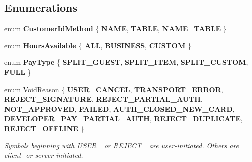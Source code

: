 \subsection*{Enumerations}
\begin{DoxyCompactItemize}
\item 
\mbox{\label{namespacecom_1_1clover_1_1sdk_1_1v3_1_1order_afc10d003bf89af56702a924943b43e70}} 
enum {\bfseries Customer\+Id\+Method} \{ {\bfseries N\+A\+ME}, 
{\bfseries T\+A\+B\+LE}, 
{\bfseries N\+A\+M\+E\+\_\+\+T\+A\+B\+LE}
 \}
\item 
\mbox{\label{namespacecom_1_1clover_1_1sdk_1_1v3_1_1order_adda3ca304970ac1775eb37a3d8f3b829}} 
enum {\bfseries Hours\+Available} \{ {\bfseries A\+LL}, 
{\bfseries B\+U\+S\+I\+N\+E\+SS}, 
{\bfseries C\+U\+S\+T\+OM}
 \}
\item 
\mbox{\label{namespacecom_1_1clover_1_1sdk_1_1v3_1_1order_a0087c2efbeb2cfefd1bc3b78a3f7dbd8}} 
enum {\bfseries Pay\+Type} \{ {\bfseries S\+P\+L\+I\+T\+\_\+\+G\+U\+E\+ST}, 
{\bfseries S\+P\+L\+I\+T\+\_\+\+I\+T\+EM}, 
{\bfseries S\+P\+L\+I\+T\+\_\+\+C\+U\+S\+T\+OM}, 
{\bfseries F\+U\+LL}
 \}
\item 
enum \hyperlink{namespacecom_1_1clover_1_1sdk_1_1v3_1_1order_acb5aac0c1f6aeeb5b636223a69d2dec2}{Void\+Reason} \{ \newline
{\bfseries U\+S\+E\+R\+\_\+\+C\+A\+N\+C\+EL}, 
{\bfseries T\+R\+A\+N\+S\+P\+O\+R\+T\+\_\+\+E\+R\+R\+OR}, 
{\bfseries R\+E\+J\+E\+C\+T\+\_\+\+S\+I\+G\+N\+A\+T\+U\+RE}, 
{\bfseries R\+E\+J\+E\+C\+T\+\_\+\+P\+A\+R\+T\+I\+A\+L\+\_\+\+A\+U\+TH}, 
\newline
{\bfseries N\+O\+T\+\_\+\+A\+P\+P\+R\+O\+V\+ED}, 
{\bfseries F\+A\+I\+L\+ED}, 
{\bfseries A\+U\+T\+H\+\_\+\+C\+L\+O\+S\+E\+D\+\_\+\+N\+E\+W\+\_\+\+C\+A\+RD}, 
{\bfseries D\+E\+V\+E\+L\+O\+P\+E\+R\+\_\+\+P\+A\+Y\+\_\+\+P\+A\+R\+T\+I\+A\+L\+\_\+\+A\+U\+TH}, 
\newline
{\bfseries R\+E\+J\+E\+C\+T\+\_\+\+D\+U\+P\+L\+I\+C\+A\+TE}, 
{\bfseries R\+E\+J\+E\+C\+T\+\_\+\+O\+F\+F\+L\+I\+NE}
 \}\begin{DoxyCompactList}\small\item\em Symbols beginning with U\+S\+E\+R\+\_\+ or R\+E\+J\+E\+C\+T\+\_\+ are user-\/initiated. Others are client-\/ or server-\/initiated. \end{DoxyCompactList}
\end{DoxyCompactItemize}


